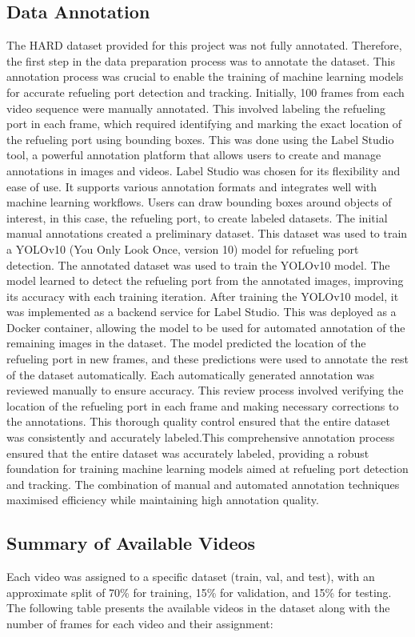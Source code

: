 \documentclass[12pt,oneside]{book} %
\begin{document}
\newpage
\subsection{Data Annotation}
The HARD dataset provided for this project was not fully annotated. Therefore,
the first step in the data preparation process was to annotate the dataset.
This annotation process was crucial to enable the training of machine learning
models for accurate refueling port detection and tracking. Initially, 100
frames from each video sequence were manually annotated. This involved labeling
the refueling port in each frame, which required identifying and marking the
exact location of the refueling port using bounding boxes. This was done using
the Label Studio tool, a powerful annotation platform that allows users to
create and manage annotations in images and videos. Label Studio was chosen for
its flexibility and ease of use. It supports various annotation formats and
integrates well with machine learning workflows. Users can draw bounding boxes
around objects of interest, in this case, the refueling port, to create labeled
datasets. The initial manual annotations created a preliminary dataset. This
dataset was used to train a YOLOv10 (You Only Look Once, version 10) model for
refueling port detection. The annotated dataset was used to train the YOLOv10
model. The model learned to detect the refueling port from the annotated
images, improving its accuracy with each training iteration. After training the
YOLOv10 model, it was implemented as a backend service for Label Studio. This
was deployed as a Docker container, allowing the model to be used for automated
annotation of the remaining images in the dataset. The model predicted the
location of the refueling port in new frames, and these predictions were used
to annotate the rest of the dataset automatically. Each automatically generated
annotation was reviewed manually to ensure accuracy. This review process
involved verifying the location of the refueling port in each frame and making
necessary corrections to the annotations. This thorough quality control ensured
that the entire dataset was consistently and accurately labeled.This
comprehensive annotation process ensured that the entire dataset was accurately
labeled, providing a robust foundation for training machine learning models
aimed at refueling port detection and tracking. The combination of manual and
automated annotation techniques maximised efficiency while maintaining high
annotation quality. 

\newpage
\subsection{Summary of Available Videos}
Each video was assigned to a specific dataset (train, val, and test), with an
approximate split of 70\% for training, 15\% for validation, and 15\% for
testing. The following table presents the available videos in the dataset along
with the number of frames for each video and their assignment:
\end{document}
